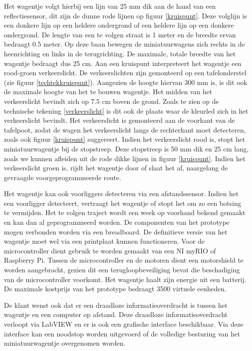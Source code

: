 \documentclass[a4paper,kulak]{kulakarticle}
\begin{document}
\begin{appendices}
Het wagentje volgt hierbij een lijn van 25 mm dik aan de hand van een reflectiesensor, dit zijn de dunne rode lijnen op figuur \ref{kruispunt}. Deze volglijn is een donkere lijn op een heldere ondergrond of een heldere lijn op een donkere ondergrond. De lengte van een te volgen straat is 1 meter en de breedte ervan bedraagt 0.5 meter. Op deze baan bewegen de miniatuurwagens zich rechts in de heenrichting en links in de terugrichting. De maximale, totale breedte van het wagentje bedraagt dus 25 cm. Aan een kruispunt interpreteert het wagentje een rood-groen verkeerslicht. De verkeerslichten zijn gemonteerd op een tafelonderstel (zie figuur \ref{techtekkruispunt}). Aangezien de hoogte hiervan 300 mm is, is dit ook de maximale hoogte van het te bouwen wagentje. Het midden van het verkeerslicht bevindt zich op 7.5 cm boven de grond. Zoals te zien op de technische tekening \ref{verkeerslicht} is dit ook de plaats waar de kleurled zich in het verkeerslicht bevindt. Het verkeerslicht is gemonteerd aan de voorkant van de tafelpoot, zodat de wagen het verkeerslicht langs de rechterkant moet detecteren, zoals ook figuur \ref{kruispunt} suggereert.  Indien het verkeerslicht rood is, stopt het miniatuurwagentje bij de stopstreep. Deze stopstreep is 50 mm dik en 25 cm lang, zoals we kunnen afleiden uit de rode dikke lijnen in figuur \ref{kruispunt}. Indien het verkeerslicht groen is, rijdt het wagentje door of slaat het af, naargelang de gevraagde voorgeprogrammeerde route.



Het wagentje kan ook voorliggers detecteren via een afstandssensor. Indien het een voorligger detecteert, vertraagt het wagentje of stopt het om zo een botsing te vermijden.
Het te volgen traject wordt een week op voorhand bekend gemaakt en kan dan al geprogrammeerd worden.
De componenten van het prototype mogen verbonden worden via een breadboard. De definitieve versie van het wagentje moet wel via een printplaat kunnen functioneren. Voor de microcontroller dient gebruik te worden gemaakt van een NI myRIO of Raspberry Pi. Tussen de microcontroller en de motoren dient een motorshield te worden aangebracht, gezien dit een terugloopbeveiliging bevat die beschadiging van de microcontroller voorkomt. Het wagentje haalt zijn energie uit een batterij. De maximale kostprijs van het prototype bedraagt 3500 virtuele eenheden.

De klant wenst ook dat er een draadloze informatieoverdracht is tussen het wagentje en een computer op afstand. Deze draadloze informatieoverdracht verloopt via LabVIEW en er is ook een grafische interface beschikbaar. Via deze interface kan een noodstop worden uitgevoerd of de volledige besturing van het miniatuurwagentje overgenomen worden.



\end{appendices}
\end{document}

